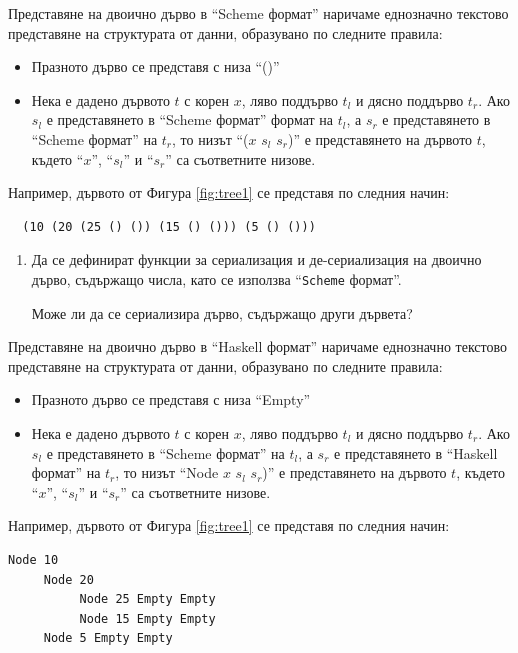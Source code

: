 \begin{mdframed}[hidealllines=true,backgroundcolor=gray!20]
  Представяне на двоично дърво в ``Scheme формат'' наричаме еднозначно текстово представяне на структурата от данни, образувано по следните правила:
  \begin{itemize}
    \item Празното дърво се представя с низа ``()''
    \item Нека е дадено дървото $t$ с корен $x$, ляво поддърво $t_l$ и дясно поддърво $t_r$. Ако $s_l$ е представянето в ``Scheme формат'' формат на $t_l$, а $s_r$ е представянето в ``Scheme формат'' на $t_r$, то низът ``($x$ $s_l$ $s_r$)'' е представянето на дървото $t$, където ``$x$'', ``$s_l$'' и ``$s_r$'' са съответните низове.
  
  \end{itemize}
  Например, дървото от Фигура \ref{fig:tree1} се представя по следния начин:
  
  \begin{verbatim}
  (10 (20 (25 () ()) (15 () ())) (5 () ()))
  \end{verbatim}
  
  \end{mdframed}

\begin{enumerate}[resume]

  \item Да се дефинират функции за сериализация и де-сериализация на двоично дърво, съдържащо числа, като се използва ``\texttt{Scheme} формат''.
  
   Може ли да се сериализира дърво, съдържащо други дървета?
\end{enumerate}


\begin{mdframed}[hidealllines=true,backgroundcolor=gray!20]
Представяне на двоично дърво в ``Haskell формат'' наричаме еднозначно текстово представяне на структурата от данни, образувано по следните правила:
\begin{itemize}
\item Празното дърво се представя с низа ``Empty''
\item Нека е дадено дървото $t$ с корен $x$, ляво поддърво $t_l$ и дясно поддърво $t_r$. Ако $s_l$ е представянето в ``Scheme формат'' на $t_l$, а $s_r$ е представянето в ``Haskell формат'' на $t_r$, то низът ``Node $x$ $s_l$ $s_r$)'' е представянето на дървото $t$, където ``$x$'', ``$s_l$'' и ``$s_r$'' са съответните низове.

\end{itemize}
Например, дървото от Фигура \ref{fig:tree1} се представя по следния начин:

\begin{verbatim}
Node 10 
     Node 20
          Node 25 Empty Empty
          Node 15 Empty Empty
     Node 5 Empty Empty
\end{verbatim}

\end{mdframed}

